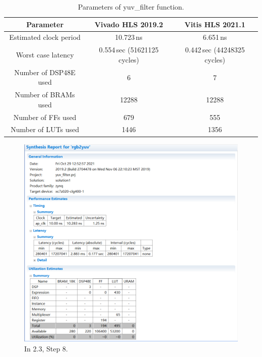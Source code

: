 \documentclass[a4paper]{article}
\begin{document}
\begin{table}[H]
    \centering
    \begin{tabular}{|c|c|c|}
        \hline
        Parameter&Vivado HLS 2019.2&Vitis HLS 2021.1\\
        \hline
        Estimated clock period&10.723\,ns&6.651\,ns\\
        \hline
        Worst case latency&0.554\,sec (51621125 cycles)&0.442\,sec (44248325 cycles)\\
        \hline
        Number of DSP48E used&6&7\\
        \hline
        Number of BRAMs used&12288&12288\\
        \hline
        Number of FFs used&679&555\\
        \hline
        Number of LUTs used&1446&1356\\
        \hline
    \end{tabular}
    \caption{Parameters of yuv\_filter function.}
\end{table}

\begin{figure}[H]
    \centering
    \includegraphics[width=1\textwidth]{2.png}
    \caption{In 2.3, Step 8.}
\end{figure}
\end{document}
